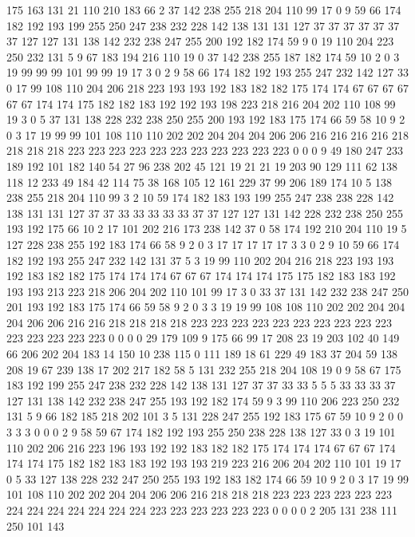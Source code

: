 175 163 131 21 110 210 183 66 2 37 142 238 255 218 204 110 99 17 0 9
59 66 174 182 192 193 199 255 250 247 238 232 228 142 138 131 131 127 37 37
37 37 37 37 37 127 127 131 138 142 232 238 247 255 200 192 182 174 59 9
0 19 110 204 223 250 232 131 5 9 67 183 194 216 110 19 0 37 142 238
255 187 182 174 59 10 2 0 3 19 99 99 99 101 99 99 19 17 3 0
2 9 58 66 174 182 192 193 255 247 232 142 127 33 0 17 99 108 110 204
206 218 223 193 193 192 183 182 182 175 174 174 67 67 67 67 67 67 174 174
175 182 182 183 192 192 193 198 223 218 216 204 202 110 108 99 19 3 0 5
37 131 138 228 232 238 250 255 200 193 192 183 175 174 66 59 58 10 9 2
0 3 17 19 99 99 101 108 110 110 202 202 204 204 204 206 206 216 216 216
216 218 218 218 218 223 223 223 223 223 223 223 223 223 223 223 0 0 0 9
49 180 247 233 189 192 101 182 140 54 27 96 238 202 45 121 19 21 21 19
203 90 129 111 62 138 118 12 233 49 184 42 114 75 38 168 105 12 161 229
37 99 206 189 174 10 5 138 238 255 218 204 110 99 3 2 10 59 174 182
183 193 199 255 247 238 238 228 142 138 131 131 127 37 37 33 33 33 33 33
37 37 127 127 131 142 228 232 238 250 255 193 192 175 66 10 2 17 101 202
216 173 238 142 37 0 58 174 192 210 204 110 19 5 127 228 238 255 192 183
174 66 58 9 2 0 3 17 17 17 17 17 3 3 0 2 9 10 59 66
174 182 192 193 255 247 232 142 131 37 5 3 19 99 110 202 204 216 218 223
193 193 192 183 182 182 175 174 174 174 67 67 67 174 174 174 175 175 182 183
183 192 193 193 213 223 218 206 204 202 110 101 99 17 3 0 33 37 131 142
232 238 247 250 201 193 192 183 175 174 66 59 58 9 2 0 3 3 19 19
99 108 108 110 202 202 204 204 204 206 206 216 216 218 218 218 218 223 223 223
223 223 223 223 223 223 223 223 223 223 223 223 0 0 0 0 29 179 109 9
175 66 99 17 208 23 19 203 102 40 149 66 206 202 204 183 14 150 10 238
115 0 111 189 18 61 229 49 183 37 204 59 138 208 19 67 239 138 17 202
217 182 58 5 131 232 255 218 204 108 19 0 9 58 67 175 183 192 199 255
247 238 232 228 142 138 131 127 37 37 33 33 5 5 5 33 33 33 37 127
131 138 142 232 238 247 255 193 192 182 174 59 9 3 99 110 206 223 250 232
131 5 9 66 182 185 218 202 101 3 5 131 228 247 255 192 183 175 67 59
10 9 2 0 0 3 3 3 0 0 0 2 9 58 59 67 174 182 192 193
255 250 238 228 138 127 33 0 3 19 101 110 202 206 216 223 196 193 192 192
183 182 182 175 174 174 174 67 67 67 174 174 174 175 182 182 183 183 192 193
193 219 223 216 206 204 202 110 101 19 17 0 5 33 127 138 228 232 247 250
255 193 192 183 182 174 66 59 10 9 2 0 3 17 19 99 101 108 110 202
202 204 204 206 206 216 218 218 218 223 223 223 223 223 223 224 224 224 224 224
224 224 223 223 223 223 223 223 0 0 0 0 2 205 131 238 111 250 101 143

